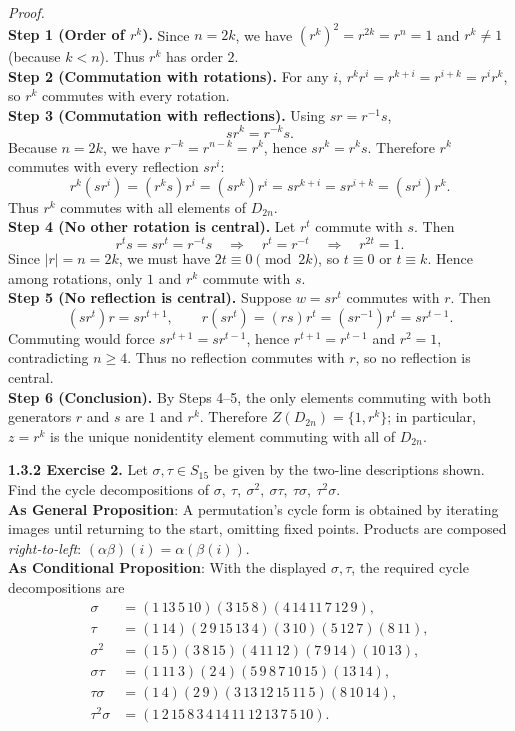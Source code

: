 \documentclass[12pt]{article}
\theoremstyle{definition}
\begin{document}
\emph{Proof.}\\
\textbf{Step 1 (Order of $r^k$).} Since $n=2k$, we have $(r^k)^2=r^{2k}=r^n=1$ and $r^k\ne1$ (because $k<n$). Thus $r^k$ has order $2$.\\
\textbf{Step 2 (Commutation with rotations).} For any $i$, $r^k r^i=r^{k+i}=r^{i+k}=r^i r^k$, so $r^k$ commutes with every rotation.\\
\textbf{Step 3 (Commutation with reflections).} Using $sr=r^{-1}s$,
\[
sr^k=r^{-k}s.
\]
Because $n=2k$, we have $r^{-k}=r^{n-k}=r^k$, hence $sr^k=r^{k}s$. Therefore $r^k$ commutes with every reflection $sr^i$:
\[
r^k(sr^i)=(r^k s)r^i=(s r^k)r^i=s r^{k+i}=s r^{i+k}=(sr^i) r^k.
\]
Thus $r^k$ commutes with all elements of $D_{2n}$.\\
\textbf{Step 4 (No other rotation is central).} Let $r^t$ commute with $s$. Then
\[
r^t s= s r^t = r^{-t} s \quad\Rightarrow\quad r^t=r^{-t}\quad\Rightarrow\quad r^{2t}=1.
\]
Since $|r|=n=2k$, we must have $2t\equiv0\pmod{2k}$, so $t\equiv0$ or $t\equiv k$. Hence among rotations, only $1$ and $r^k$ commute with $s$.\\
\textbf{Step 5 (No reflection is central).} Suppose $w=sr^t$ commutes with $r$. Then
\[
(sr^t)r = sr^{t+1},\qquad r(sr^t)=(rs)r^t=(sr^{-1})r^t=sr^{t-1}.
\]
Commuting would force $sr^{t+1}=sr^{t-1}$, hence $r^{t+1}=r^{t-1}$ and $r^2=1$, contradicting $n\ge4$. Thus no reflection commutes with $r$, so no reflection is central.\\
\textbf{Step 6 (Conclusion).} By Steps 4–5, the only elements commuting with both generators $r$ and $s$ are $1$ and $r^k$. Therefore $Z(D_{2n})=\{1,r^k\}$; in particular, $z=r^k$ is the unique nonidentity element commuting with all of $D_{2n}$.\\

\newpage

\noindent \textbf{1.3.2 Exercise 2.} Let $\sigma,\tau\in S_{15}$ be given by the two-line descriptions shown. Find the cycle decompositions of $\sigma,\ \tau,\ \sigma^2,\ \sigma\tau,\ \tau\sigma,\ \tau^2\sigma$.\\ %

\noindent\textbf{As General Proposition}: A permutation’s cycle form is obtained by iterating images until returning to the start, omitting fixed points. Products are composed \emph{right-to-left}: $(\alpha\beta)(i)=\alpha(\beta(i))$.\\

\noindent \textbf{As Conditional Proposition}: With the displayed $\sigma,\tau$, the required cycle decompositions are
\[
\begin{aligned}
\sigma&=(1\,13\,5\,10)(3\,15\,8)(4\,14\,11\,7\,12\,9),\\
\tau&=(1\,14)(2\,9\,15\,13\,4)(3\,10)(5\,12\,7)(8\,11),\\
\sigma^{2}&=(1\,5)(3\,8\,15)(4\,11\,12)(7\,9\,14)(10\,13),\\
\sigma\tau&=(1\,11\,3)(2\,4)(5\,9\,8\,7\,10\,15)(13\,14),\\
\tau\sigma&=(1\,4)(2\,9)(3\,13\,12\,15\,11\,5)(8\,10\,14),\\
\tau^{2}\sigma&=(1\,2\,15\,8\,3\,4\,14\,11\,12\,13\,7\,5\,10).
\end{aligned}
\]
\end{document}
